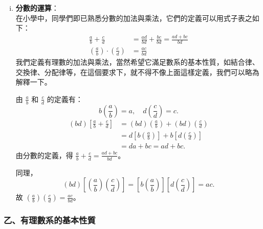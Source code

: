 \begin{enumerate}[(i)]
  有理數的另一種表示法便是「小數」。關於小數的觀念，同學們在小學及國中階段都已十分熟悉，任何一個有理數皆可化為小數（有限或循環），反之，任一有限或循環小數，皆可化為一有理數，關於這一點，我們以後還要再講到。

  \item \textbf{分數的運算}：\\
  在小學中，同學們即已熟悉分數的加法與乘法，它們的定義可以用式子表之如下：
  \begin{align*}
    \frac{a}{b} + \frac{c}{d} &= \frac{ad}{bd} + \frac{bc}{bd} = \frac{ad+bc}{bd} \\
    \left(\frac{a}{b}\right) \cdot \left(\frac{c}{d}\right) &= \frac{ac}{bd}
  \end{align*}
  我們定義有理數的加法與乘法，當然希望它滿足數系的基本性質，如結合律、交換律、分配律等，在這個要求下，就不得不像上面這樣定義，我們可以略為解釋一下。

  由 $\frac{a}{b}$ 和 $\frac{c}{d}$ 的定義有：
  \begin{equation*}
    b\left(\frac{a}{b}\right) = a, \quad d\left(\frac{c}{d}\right) = c.
  \end{equation*}
  \begin{align*}
    (bd)\left[\frac{a}{b} + \frac{c}{d}\right] &= (bd)\left(\frac{a}{b}\right) + (bd)\left(\frac{c}{d}\right) \\
    &= d\left[b\left(\frac{a}{b}\right)\right] + b\left[d\left(\frac{c}{d}\right)\right] \\
    &= da + bc = ad + bc.
  \end{align*}
  由分數的定義，得 $\frac{a}{b} + \frac{c}{d} = \frac{ad+bc}{bd}$。

  同理，
  \begin{equation*}
    (bd)\left[\left(\frac{a}{b}\right)\left(\frac{c}{d}\right)\right] = \left[b\left(\frac{a}{b}\right)\right]\left[d\left(\frac{c}{d}\right)\right] = ac.
  \end{equation*}
  故 $\left(\frac{a}{b}\right)\left(\frac{c}{d}\right) = \frac{ac}{bd}$。

\end{enumerate}

\subsubsection*{乙、有理數系的基本性質}\label{subsec:rat_properties}

